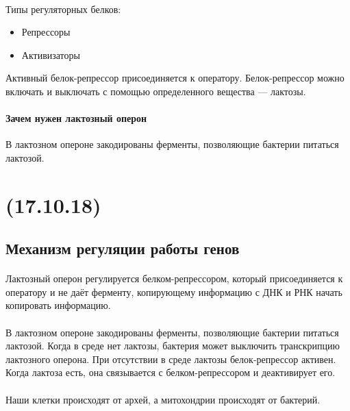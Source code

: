 \documentclass[dvipdfmx]{article}
\begin{document}
\paragraph{}
Типы регуляторных белков:
\begin{itemize}
\item
  Репрессоры
\item
  Активизаторы
\end{itemize}

Активный белок-репрессор присоединяется к оператору.
Белок-репрессор можно включать и выключать с помощью определенного вещества --- лактозы.

\paragraph{Зачем нужен лактозный оперон}

В лактозном опероне закодированы ферменты, позволяющие бактерии питаться лактозой.

\newpage
\noindent\makebox[\linewidth]{\rule{\paperwidth}{0.4pt}}
\section{(17.10.18)}
\noindent\makebox[\linewidth]{\rule{\paperwidth}{0.4pt}}

\subsection{Механизм регуляции работы генов}

\paragraph{}
Лактозный оперон регулируется белком-репрессором, который присоединяется к оператору и не даёт ферменту, копирующему
информацию с ДНК и РНК начать копировать информацию.

\paragraph{}
В лактозном опероне закодированы ферменты, позволяющие бактерии питаться лактозой. Когда в среде нет лактозы, бактерия
может выключить транскрипцию лактозного оперона. При отсутствии в среде лактозы белок-репрессор активен. Когда лактоза
есть, она связывается с белком-репрессором и деактивирует его.

\paragraph{}
Наши клетки происходят от архей, а митохондрии происходят от бактерий.
\end{document}
